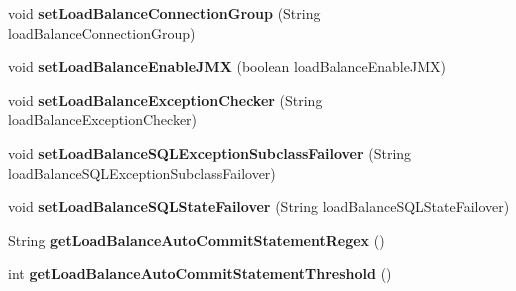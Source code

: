 \begin{DoxyCompactItemize}
void {\bfseries set\+Load\+Balance\+Connection\+Group} (String load\+Balance\+Connection\+Group)
\item 
\mbox{\label{classcom_1_1mysql_1_1jdbc_1_1jdbc2_1_1optional_1_1_connection_wrapper_a0f11414c981963c3e3f23f88023e6b31}} 
void {\bfseries set\+Load\+Balance\+Enable\+J\+MX} (boolean load\+Balance\+Enable\+J\+MX)
\item 
\mbox{\label{classcom_1_1mysql_1_1jdbc_1_1jdbc2_1_1optional_1_1_connection_wrapper_a53f48d54af3f329c0c01e875517c2923}} 
void {\bfseries set\+Load\+Balance\+Exception\+Checker} (String load\+Balance\+Exception\+Checker)
\item 
\mbox{\label{classcom_1_1mysql_1_1jdbc_1_1jdbc2_1_1optional_1_1_connection_wrapper_ac3f1440009eb227105a9f34c6c3efc0a}} 
void {\bfseries set\+Load\+Balance\+S\+Q\+L\+Exception\+Subclass\+Failover} (String load\+Balance\+S\+Q\+L\+Exception\+Subclass\+Failover)
\item 
\mbox{\label{classcom_1_1mysql_1_1jdbc_1_1jdbc2_1_1optional_1_1_connection_wrapper_ad7cadf4d56ce301e2c39cddbe84c2d1b}} 
void {\bfseries set\+Load\+Balance\+S\+Q\+L\+State\+Failover} (String load\+Balance\+S\+Q\+L\+State\+Failover)
\item 
\mbox{\label{classcom_1_1mysql_1_1jdbc_1_1jdbc2_1_1optional_1_1_connection_wrapper_a0140e54c5979180e433f870c80b9863d}} 
String {\bfseries get\+Load\+Balance\+Auto\+Commit\+Statement\+Regex} ()
\item 
\mbox{\label{classcom_1_1mysql_1_1jdbc_1_1jdbc2_1_1optional_1_1_connection_wrapper_af82fc4945ce14ef7989ff0066e770d77}} 
int {\bfseries get\+Load\+Balance\+Auto\+Commit\+Statement\+Threshold} ()
\item 
\mbox{\label{classcom_1_1mysql_1_1jdbc_1_1jdbc2_1_1optional_1_1_connection_wrapper_a8124b2604aee91c12581e5f7853ba43d}} 

\end{DoxyCompactItemize}
